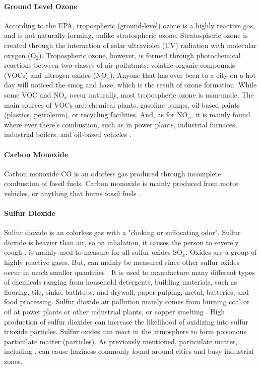 \paragraph{Ground Level Ozone}
According to the EPA, tropospheric (ground-level) ozone \ozone is a highly
reactive gas, and is not naturally forming, unlike stratospheric ozone.
Stratospheric ozone is created through the interaction of solar ultraviolet
(UV) radiation with molecular oxygen (O$_2$). Tropospheric ozone, however, is
formed through photochemical reactions between two classes of air pollutants:
volatile organic compounds (VOCs) and nitrogen oxides (NO$_x$). Anyone that has
ever been to a city on a hot day will noticed the smog and haze, which is the
result of ozone formation. While some VOC and NO$_x$ occur naturally, most
tropospheric ozone is man-made. The main sources of VOCs are: chemical plants,
gasoline pumps, oil-based paints (plastics, petroleum), or recycling facilities.
And, as for NO$_x$, it is mainly found where ever there's combustion, such as
in power plants, industrial furnaces, industrial boilers, and oil-based vehicles
\cite{epa-what-is-ozone}.

\paragraph{Carbon Monoxide}
Carbon monoxide CO is an odorless gas produced through incomplete combustion of
fossil fuels. Carbon monoxide is mainly produced from motor vehicles, or
anything that burns fossil fuels \cite{health-impacts-air-pollution-review}.

\paragraph{Sulfur Dioxide}
Sulfur dioxide \sdo is an colorless gas with a "choking or suffocating odor".
Sulfur dioxide is heavier than air, so on inhalation, it causes the person to
severely cough \cite{pubchem-so2}. \sdo is mainly used to measure for all sulfur
oxides SO$_x$. Oxides are a group of highly reactive gases. But, \sdo can mainly
be measured since other sulfur oxides occur in much smaller quantities
\cite{epa-so2-basics}. It is used to manufacture many different types of
chemicals ranging from household detergents, building materials, such as
flooring, tile, sinks, bathtubs, and drywall, paper pulping, metal, batteries,
and food processing. Sulfur dioxide air pollution mainly comes from burning coal
or oil at power plants or other industrial plants, or copper smelting
\cite{pubchem-so2}. High production of sulfur dioxides can increase the
likelihood of \sdo oxidizing into sulfur trioxide \sto particles. Sulfur oxides
\sox can react in the atmosphere to form poisonous particulate matter
(particles). As previously mentioned, particulate matter, including \sox, can
cause haziness commonly found around cities and busy industrial zones.

